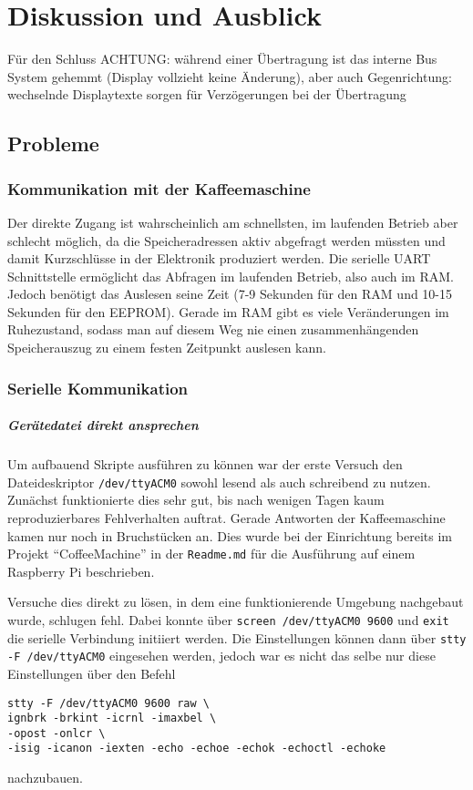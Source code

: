 \chapter{Diskussion und Ausblick}
\todo
Für den Schluss
ACHTUNG: während einer Übertragung ist das interne Bus System gehemmt (Display vollzieht keine Änderung), aber auch Gegenrichtung: wechselnde Displaytexte sorgen für Verzögerungen bei der Übertragung
\todo

\section{Probleme}

\subsection{Kommunikation mit der Kaffeemaschine} \label{subsec:zugangSeriellDirekt}
Der direkte Zugang ist wahrscheinlich am schnellsten, im laufenden Betrieb aber schlecht möglich, da die Speicheradressen aktiv abgefragt werden müssten und damit Kurzschlüsse in der Elektronik produziert werden.
Die serielle \ac{UART} Schnittstelle ermöglicht das Abfragen im laufenden Betrieb, also auch im \ac{RAM}.
Jedoch benötigt das Auslesen seine Zeit (7-9 Sekunden für den \ac{RAM} und 10-15 Sekunden für den \ac{EEPROM}).
Gerade im \ac{RAM} gibt es viele Veränderungen im Ruhezustand, sodass man auf diesem Weg nie einen zusammenhängenden Speicherauszug zu einem festen Zeitpunkt auslesen kann.

\subsection{Serielle Kommunikation} \label{subsec:kommunikationGeraetedateiLibserialLibrary}
\paragraph{Gerätedatei direkt ansprechen}
Um aufbauend Skripte ausführen zu können war der erste Versuch den Dateideskriptor \texttt{/dev/ttyACM0} sowohl lesend als auch schreibend zu nutzen.
Zunächst funktionierte dies sehr gut, bis nach wenigen Tagen kaum reproduzierbares Fehlverhalten auftrat.
Gerade Antworten der Kaffeemaschine kamen nur noch in Bruchstücken an.
Dies wurde bei der Einrichtung bereits im Projekt "`CoffeeMachine"'\cite{GitCoffeeMachine} in der \texttt{Readme.md} für die Ausführung auf einem Raspberry Pi beschrieben.

Versuche dies direkt zu lösen, in dem eine funktionierende Umgebung nachgebaut wurde, schlugen fehl.
Dabei konnte über \texttt{screen /dev/ttyACM0 9600} und \texttt{exit} die serielle Verbindung initiiert werden.
Die Einstellungen können dann über \texttt{stty -F /dev/ttyACM0} eingesehen werden, jedoch war es nicht das selbe nur diese Einstellungen über den Befehl
\begin{lstlisting}[label=lst:stty,caption={stty zum setzen der Verbindungseinstellungen}]
stty -F /dev/ttyACM0 9600 raw \
ignbrk -brkint -icrnl -imaxbel \
-opost -onlcr \
-isig -icanon -iexten -echo -echoe -echok -echoctl -echoke
\end{lstlisting}
nachzubauen.

